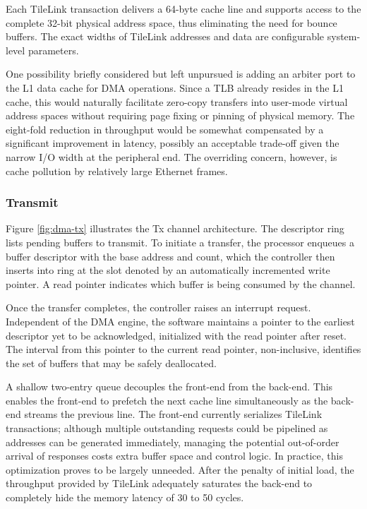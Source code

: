 Each TileLink transaction delivers a 64-byte cache line and supports
access to the complete 32-bit physical address space, thus eliminating
the need for bounce buffers.
The exact widths of TileLink addresses and data are configurable
system-level parameters.

One possibility briefly considered but left unpursued is adding an
arbiter port to the L1 data cache for DMA operations.
Since a TLB already resides in the L1 cache, this would naturally
facilitate zero-copy transfers into user-mode virtual address spaces
without requiring page fixing or pinning of physical memory.
The eight-fold reduction in throughput would be somewhat compensated by
a significant improvement in latency, possibly an acceptable trade-off
given the narrow I/O width at the peripheral end.
The overriding concern, however, is cache pollution by relatively large
Ethernet frames.

\subsubsection{Transmit}

Figure \ref{fig:dma-tx} illustrates the Tx channel architecture.
The descriptor ring lists pending buffers to transmit.
To initiate a transfer, the processor enqueues a buffer descriptor with
the base address and count, which the controller then inserts into ring
at the slot denoted by an automatically incremented write pointer.
A read pointer indicates which buffer is being consumed by the channel.

Once the transfer completes, the controller raises an interrupt request.
Independent of the DMA engine, the software maintains a pointer to the
earliest descriptor yet to be acknowledged, initialized with the read
pointer after reset.
The interval from this pointer to the current read pointer,
non-inclusive, identifies the set of buffers that may be safely
deallocated.

A shallow two-entry queue decouples the front-end from the back-end.
This enables the front-end to prefetch the next cache line
simultaneously as the back-end streams the previous line.
The front-end currently serializes TileLink transactions;
although multiple outstanding requests could be pipelined as addresses
can be generated immediately, managing the potential out-of-order
arrival of responses costs extra buffer space and control logic.
In practice, this optimization proves to be largely unneeded.
After the penalty of initial load, the throughput provided by TileLink
adequately saturates the back-end to completely hide the memory latency
of 30 to 50 cycles.

